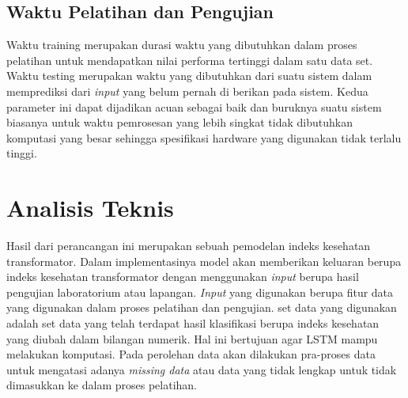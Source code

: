 \subsection{Waktu Pelatihan dan Pengujian}
Waktu training merupakan durasi waktu yang dibutuhkan dalam proses pelatihan untuk mendapatkan nilai performa tertinggi dalam satu data set. Waktu testing merupakan waktu yang dibutuhkan dari suatu sistem dalam memprediksi dari \textit{input} yang belum pernah di berikan pada sistem. Kedua parameter ini dapat dijadikan acuan sebagai baik dan buruknya suatu sistem biasanya untuk waktu pemrosesan  yang lebih singkat tidak dibutuhkan komputasi yang besar sehingga spesifikasi hardware yang digunakan tidak terlalu tinggi.





\section{Analisis Teknis}

Hasil dari perancangan ini merupakan sebuah pemodelan indeks kesehatan transformator. Dalam implementasinya model akan memberikan keluaran berupa indeks kesehatan transformator dengan menggunakan \textit{input} berupa hasil pengujian laboratorium atau lapangan. \textit{Input} yang digunakan berupa fitur data yang digunakan dalam proses pelatihan dan pengujian. set data yang digunakan adalah set data yang telah terdapat hasil klasifikasi berupa indeks kesehatan yang diubah dalam bilangan numerik. Hal ini bertujuan agar LSTM mampu melakukan komputasi. Pada perolehan data akan dilakukan pra-proses data untuk mengatasi adanya \textit{missing data} atau data yang tidak lengkap untuk tidak dimasukkan ke dalam proses pelatihan.


